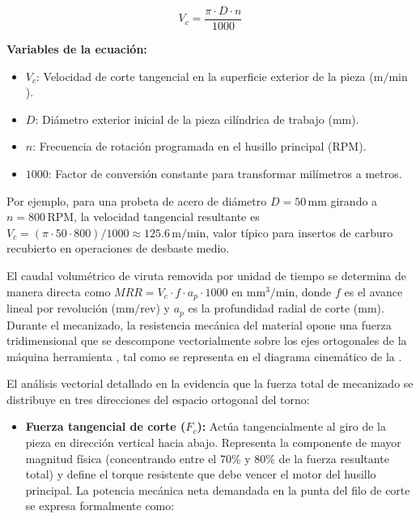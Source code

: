 \begin{equation}
V_c = \frac{\pi \cdot D \cdot n}{1000}
\label{eq:velocidad_corte}
\end{equation}

\noindent\textbf{Variables de la ecuación:}
\begin{itemize}
    \item $V_c$: Velocidad de corte tangencial en la superficie exterior de la pieza ($\text{m/min}$).
    \item $D$: Diámetro exterior inicial de la pieza cilíndrica de trabajo ($\text{mm}$).
    \item $n$: Frecuencia de rotación programada en el husillo principal ($\text{RPM}$).
    \item $1000$: Factor de conversión constante para transformar milímetros a metros.
\end{itemize}

Por ejemplo, para una probeta de acero de diámetro $D = 50\,\text{mm}$ girando a $n = 800\,\text{RPM}$, la velocidad tangencial resultante es $V_c = (\pi \cdot 50 \cdot 800)/1000 \approx 125.6\,\text{m/min}$, valor típico para insertos de carburo recubierto en operaciones de desbaste medio.

El caudal volumétrico de viruta removida por unidad de tiempo se determina de manera directa como $MRR = V_c \cdot f \cdot a_p \cdot 1000$ en $\text{mm}^3/\text{min}$, donde $f$ es el avance lineal por revolución ($\text{mm/rev}$) y $a_p$ es la profundidad radial de corte ($\text{mm}$). Durante el mecanizado, la resistencia mecánica del material opone una fuerza tridimensional que se descompone vectorialmente sobre los ejes ortogonales de la máquina herramienta \citep{trejo2010, sandvik2020}, tal como se representa en el diagrama cinemático de la .


El análisis vectorial detallado en la  evidencia que la fuerza total de mecanizado se distribuye en tres direcciones del espacio ortogonal del torno:
\begin{itemize}
    \item \textbf{Fuerza tangencial de corte ($F_c$):} Actúa tangencialmente al giro de la pieza en dirección vertical hacia abajo. Representa la componente de mayor magnitud física (concentrando entre el 70\% y 80\% de la fuerza resultante total) y define el torque resistente que debe vencer el motor del husillo principal. La potencia mecánica neta demandada en la punta del filo de corte se expresa formalmente como:
\end{itemize}

